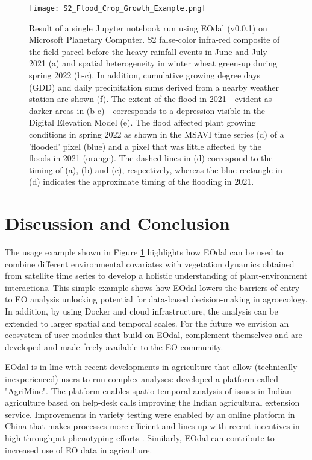 \begin{figure}[H]
    \centering
    \texttt{[image: S2\_Flood\_Crop\_Growth\_Example.png]}
    \caption{Result of a single Jupyter notebook run using EOdal (v0.0.1) on Microsoft Planetary Computer. S2 false-color infra-red composite of the field parcel before the heavy rainfall events in June and July 2021 (a) and spatial heterogeneity in winter wheat green-up during spring 2022 (b-c). In addition, cumulative growing degree days (GDD) and daily precipitation sums derived from a nearby weather station are shown (f). The extent of the flood in 2021 - evident as darker areas in (b-c) - corresponds to a depression visible in the Digital Elevation Model (e). The flood affected plant growing conditions in spring 2022 as shown in the MSAVI time series (d) of a 'flooded' pixel (blue) and a pixel that was little affected by the floods in 2021 (orange). The dashed lines in (d) correspond to the timing of (a), (b) and (c), respectively, whereas the blue rectangle in (d) indicates the approximate timing of the flooding in 2021.}
    \label{fig:s2-fig}
\end{figure}

\section{Discussion and Conclusion}
\label{sec:conclusions}
%
The usage example shown in Figure \ref{fig:s2-fig} highlights how EOdal can be used to combine different environmental covariates with vegetation dynamics obtained from satellite time series to develop a holistic understanding of plant-environment interactions. This simple example shows how EOdal lowers the barriers of entry to EO analysis unlocking potential for data-based decision-making in agroecology. In addition, by using Docker and cloud infrastructure, the analysis can be extended to larger spatial and temporal scales. For the future we envision an ecosystem of user modules that build on EOdal, complement themselves and are developed and made freely available to the EO community. 

EOdal is in line with recent developments in agriculture that allow (technically inexperienced) users to run complex analyses: \citet{godara_agrimine_2022} developed a platform called "AgriMine". The platform enables spatio-temporal analysis of issues in Indian agriculture based on help-desk calls improving the Indian agricultural extension service. Improvements in variety testing were enabled by an online platform in China that makes processes more efficient and lines up with recent incentives in high-throughput phenotyping efforts \citep{pan_online_2022}. Similarly, EOdal can contribute to increased use of EO data in agriculture.

